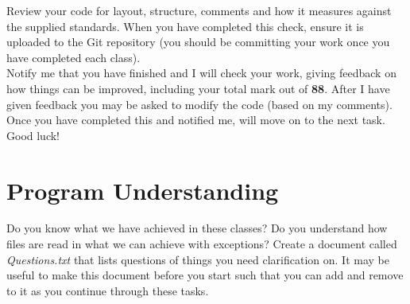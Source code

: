 \documentclass[a4paper,12pt]{article}
\begin{document}
Review your code for layout, structure, comments and how it measures against the supplied standards. When you have completed this check, ensure it is uploaded to the Git repository (you should be committing your work once you have completed each class).\\

Notify me that you have finished and I will check your work, giving feedback on how things can be improved, including your total mark out of {\bf 88}. After I have given feedback you may be asked to modify the code (based on my comments). Once you have completed this and notified me, will move on to the next task. Good luck!

\vspace{0.5cm}
\section{Program Understanding}
Do you know what we have achieved in these classes? Do you understand how files are read in what we can achieve with exceptions? Create a document called \textit{Questions.txt} that lists questions of things you need clarification on. It may be useful to make this document before you start such that you can add and remove to it as you continue through these tasks.
\end{document}
